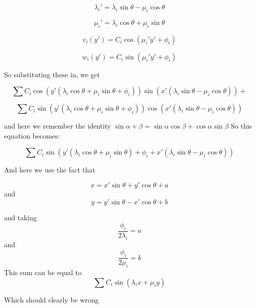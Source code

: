 \documentclass[12pt]{report}
\numberwithin{definition}{section}
\begin{document}
{ 
 
  \[
  \lambda_i' = \lambda_i\sin{\theta}-\mu_i\cos{\theta}
 \]

  \[
  \mu_i' = \lambda_i\cos{\theta}+\mu_i\sin{\theta}
 \]
 
  \[
  v_i(y') = C_i \cos{( \mu_i' y'+\phi_i)}
 \]
 
 \[
  w_i(y') = C_i \sin{( \mu_i' y'+\phi_i)}
 \]

 So substituting these in, we get 
 
  \[
  \sum C_i \cos{(y'( \lambda_i\cos{\theta}+\mu_i\sin{\theta}+\phi_i))}\sin{(x'(\lambda_i\sin{\theta}-\mu_i\cos{\theta}))} +
 \]
 
   \[
  \sum C_i \sin{(y'( \lambda_i\cos{\theta}+\mu_i\sin{\theta}+\phi_i))}\cos{(x'(\lambda_i\sin{\theta}-\mu_i\cos{\theta}))} 
 \]
 
  and here we remember the identity $\sin{\alpha+\beta} = \sin{\alpha}\cos{\beta}+\cos{\alpha}\sin{\beta}$  
	So this equation becomes: 
	
  \[
\sum C_i \sin{(y'( \lambda_i\cos{\theta}+\mu_i\sin{\theta})+\phi_i+x'( \lambda_i\sin{\theta}-\mu_i\cos{\theta}))}
 \]
 
 And here we use the fact that 
 
 \[
 x= x'\sin{\theta}+y'\cos{\theta} + a
 \]
 and 
   \[
 y= y'\sin{\theta}-x'\cos{\theta} + b
 \] 

 
and taking 
 \[
\frac{ \phi_i}{2\lambda_i}=a
 \]
 and 
  \[
\frac{ \phi_i}{2\mu_i}=b
 \]
 This sum can be equal to 
   \[
\sum C_i \sin{(\lambda_ix+\mu_iy)}
 \]
 
 
 Which should clearly be wrong
 

 }
 
 
 \break
 
\end{document}
